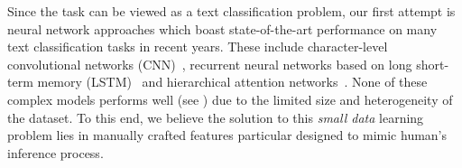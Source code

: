 
Since the task can be viewed as a text classification problem, 
our first attempt is neural network approaches which boast 
state-of-the-art performance on many text classification tasks in recent years. 
These include character-level convolutional networks (CNN)~\cite{cnn}, 
recurrent neural networks based on long short-term memory (LSTM)~\cite{lstm} 
and hierarchical attention networks~\cite{hierarchy}. 
None of these complex models performs well (see ) 
due to the limited size and heterogeneity of the dataset. 
To this end, we believe the solution to this {\em small data} learning problem
lies in manually crafted features particular designed to mimic human's 
inference process. 


